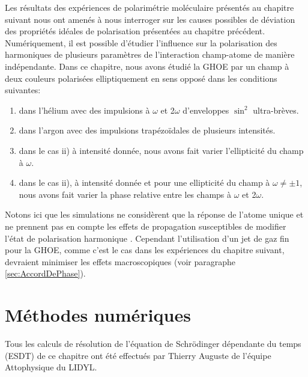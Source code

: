 Les résultats des expériences de polarimétrie moléculaire présentés au chapitre suivant nous ont amenés à nous interroger sur les causes possibles de déviation des propriétés idéales de polarisation présentées au chapitre précédent. Numériquement, il est possible d'étudier l'influence sur la polarisation des harmoniques de plusieurs paramètres de l'interaction champ-atome de manière indépendante. Dans ce chapitre, nous avons étudié la GHOE par un champ à deux couleurs polarisées elliptiquement en sens opposé dans les conditions suivantes:
\begin{enumerate}[label=\roman*)]
\item dans l'hélium avec des impulsions à $\omega$ et 2$\omega$ d'enveloppes $\sin^2$ ultra-brèves.
\item dans l'argon avec des impulsions trapézoïdales de plusieurs intensités.
\item dans le cas ii) à intensité donnée, nous avons fait varier l'ellipticité du champ à $\omega$.
\item dans le cas ii), à intensité donnée et pour une ellipticité du champ à $\omega \neq \pm 1$, nous avons fait varier la phase relative entre les champs à $\omega$ et 2$\omega$.
\end{enumerate}
Notons ici que les simulations ne considèrent que la réponse de l'atome unique et ne prennent pas en compte les effets de propagation susceptibles de modifier l'état de polarisation harmonique . Cependant l'utilisation d'un jet de gaz fin pour la GHOE, comme c'est le cas dans les expériences du chapitre suivant, devraient minimiser les effets macroscopiques (voir paragraphe \ref{sec:AccordDePhase}).

\section{Méthodes numériques}
\label{sec:MethodesNum}
Tous les calculs de résolution de l'équation de Schrödinger dépendante du temps (ESDT) de ce chapitre ont été effectués par Thierry Auguste de l'équipe Attophysique du LIDYL. 

